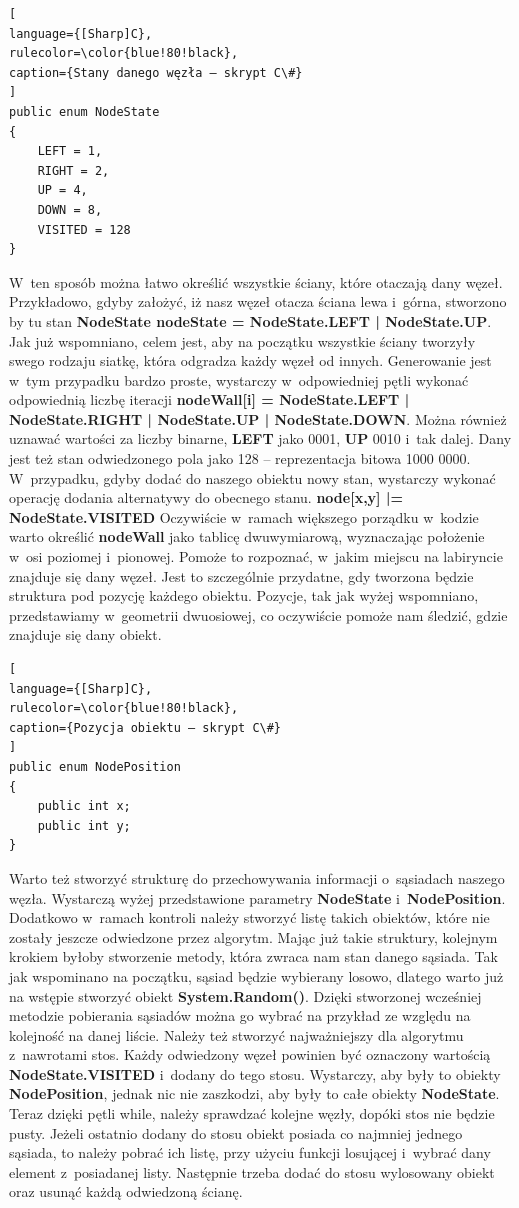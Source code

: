 \documentclass[oneside,polski,logo]{amuthesis}
\begin{document}
\begin{lstlisting}[
language={[Sharp]C},
rulecolor=\color{blue!80!black},
caption={Stany danego węzła – skrypt C\#}
]
public enum NodeState
{
    LEFT = 1,
    RIGHT = 2,
    UP = 4,
    DOWN = 8,
    VISITED = 128
}
\end{lstlisting}
W~ten sposób można łatwo określić wszystkie ściany, które otaczają dany węzeł. Przykładowo, gdyby założyć, iż nasz węzeł otacza ściana lewa i~górna, stworzono by tu stan \textbf{NodeState nodeState = NodeState.LEFT | NodeState.UP}. Jak już wspomniano, celem jest, aby na początku wszystkie ściany tworzyły swego rodzaju siatkę, która odgradza każdy węzeł od innych. Generowanie jest w~tym przypadku bardzo proste, wystarczy w~odpowiedniej pętli wykonać odpowiednią liczbę iteracji \textbf{nodeWall[i] = NodeState.LEFT | NodeState.RIGHT | NodeState.UP | NodeState.DOWN}. Można również uznawać wartości za liczby binarne, \textbf{LEFT} jako 0001, \textbf{UP} 0010 i~tak dalej. Dany jest też stan odwiedzonego pola jako 128 – reprezentacja bitowa 1000 0000. W~przypadku, gdyby dodać do naszego obiektu nowy stan, wystarczy wykonać operację dodania alternatywy do obecnego stanu. \textbf{node[x,y] |= NodeState.VISITED} Oczywiście w~ramach większego porządku w~kodzie warto określić \textbf{nodeWall} jako tablicę dwuwymiarową, wyznaczając położenie w~osi poziomej i~pionowej. Pomoże to rozpoznać, w~jakim miejscu na labiryncie znajduje się dany węzeł. Jest to szczególnie przydatne, gdy tworzona będzie struktura pod pozycję każdego obiektu. Pozycje, tak jak wyżej wspomniano, przedstawiamy w~geometrii dwuosiowej, co oczywiście pomoże nam śledzić, gdzie znajduje się dany obiekt. 

\begin{lstlisting}[
language={[Sharp]C},
rulecolor=\color{blue!80!black},
caption={Pozycja obiektu – skrypt C\#}
]
public enum NodePosition
{
	public int x;
	public int y;
}
\end{lstlisting}
Warto też stworzyć strukturę do przechowywania informacji o~sąsiadach naszego węzła. Wystarczą wyżej przedstawione parametry \textbf{NodeState} i~\textbf{NodePosition}. Dodatkowo w~ramach kontroli należy stworzyć listę takich obiektów, które nie zostały jeszcze odwiedzone przez algorytm. Mając już takie struktury, kolejnym krokiem byłoby stworzenie metody, która zwraca nam stan danego sąsiada. Tak jak wspominano na początku, sąsiad będzie wybierany losowo, dlatego warto już na wstępie stworzyć obiekt \textbf{System.Random()}. Dzięki stworzonej wcześniej metodzie pobierania sąsiadów można go wybrać na przykład ze względu na kolejność na danej liście. Należy też stworzyć najważniejszy dla algorytmu z~nawrotami stos. Każdy odwiedzony węzeł powinien być oznaczony wartością \textbf{NodeState.VISITED} i~dodany do tego stosu. Wystarczy, aby były to obiekty \textbf{NodePosition}, jednak nic nie zaszkodzi, aby były to całe obiekty \textbf{NodeState}. Teraz dzięki pętli while, należy sprawdzać kolejne węzły, dopóki stos nie będzie pusty. Jeżeli ostatnio dodany do stosu obiekt posiada co najmniej jednego sąsiada, to należy pobrać ich listę, przy użyciu funkcji losującej i~wybrać dany element z~posiadanej listy. Następnie trzeba dodać do stosu wylosowany obiekt oraz usunąć każdą odwiedzoną ścianę.
\end{document}
